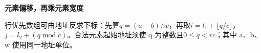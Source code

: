 {\color{ink}\bfseries 元素偏移，再乘元素宽度}\par\vspace{1bp}行优先数组可由地址反求下标：先算\(q=\allowbreak{}(a-b)/\allowbreak{}w\)，再取\(i=\allowbreak{}l_{1}+\allowbreak{}\lfloor q/\allowbreak{}c\rfloor \)，\(j=\allowbreak{}l_{2}+\allowbreak{}(q \operatorname{mod} c)\)。合法元素起始地址须使 q 为整数且\(0\le q<\allowbreak{}rc\)；其中 a、b、w 使用同一地址单位。

